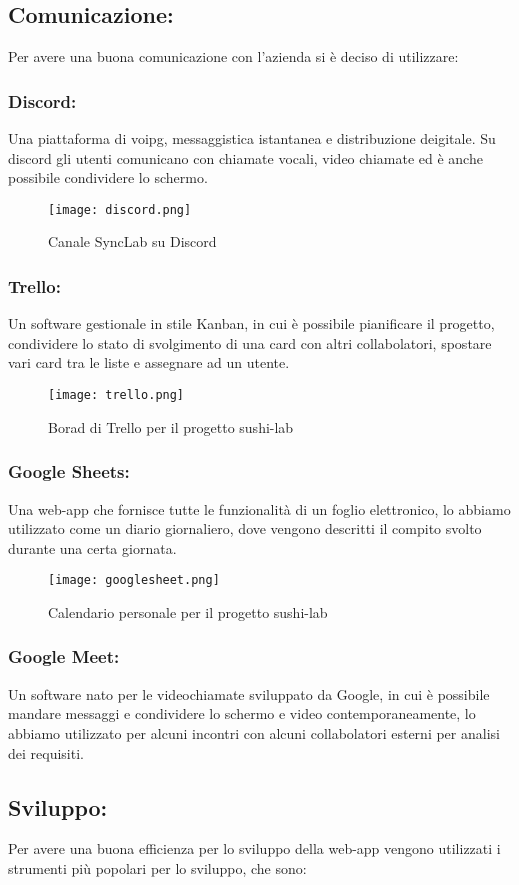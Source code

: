 \subsection{Comunicazione:}
Per avere una buona comunicazione con l'azienda si è deciso di utilizzare:
\subsubsection{Discord:}
Una piattaforma di \gls{voipg}, messaggistica istantanea e distribuzione deigitale. Su discord gli utenti comunicano con chiamate vocali, video chiamate ed è anche possibile condividere lo schermo.
\begin{figure}[H]
    \centering
    \texttt{[image: discord.png]}
    \caption{Canale SyncLab su Discord}
\end{figure}
\subsubsection{Trello:}
Un software gestionale in stile Kanban, in cui è possibile pianificare il progetto, condividere lo stato di svolgimento di una card con altri collabolatori, spostare vari card tra le liste e assegnare ad un utente.
\begin{figure}[H]
    \centering
    \texttt{[image: trello.png]}
    \caption{Borad di Trello per il progetto sushi-lab}
\end{figure}
\subsubsection{Google Sheets:}
Una web-app che fornisce tutte le funzionalità di un foglio elettronico, lo abbiamo utilizzato come un diario giornaliero, dove vengono descritti il compito svolto durante una certa giornata.
\begin{figure}[H]
    \centering
    \texttt{[image: googlesheet.png]}
    \caption{Calendario personale per il progetto sushi-lab}
\end{figure}
\subsubsection{Google Meet:}
Un software nato per le videochiamate sviluppato da Google, in cui è possibile mandare messaggi e condividere lo schermo e video contemporaneamente, lo abbiamo utilizzato per alcuni incontri con alcuni collabolatori esterni per analisi dei requisiti.
\subsection{Sviluppo:}
Per avere una buona efficienza per lo sviluppo della web-app vengono utilizzati i strumenti più popolari per lo sviluppo, che sono:
